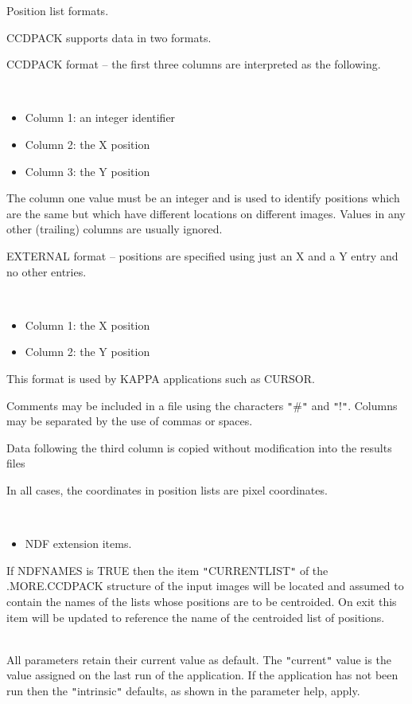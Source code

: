 \documentclass[twoside,11pt]{article}
\newcommand{\xref}[3]{#1}
\renewcommand{\_}{\texttt{\symbol{95}}}
\newcommand{\qt}[1]{{\tt "}#1{\tt "}}
\newcommand{\sstdiytopic}[2]{\item[#1:] \mbox{} \\[1.3ex] #2}
\newcommand{\sstitemlist}[1]{
  \mbox{} \\
  \vspace{-3.5ex}
  \begin{itemize}
     #1
  \end{itemize}
}
\newcommand{\sstitem}{\item}
\newcommand{\sstdiytopic}[2]{\item[{#1:}] #2 }
\newcommand{\sstitemlist}[1]{
      \begin{itemize}
         #1
      \end{itemize}
      \\
   }
\newcommand{\sstitem}{\item}
\begin{document}
{{{         \sstitem
         Position list formats.

      }
        CCDPACK supports data in two formats.

        CCDPACK format -- the first three columns are interpreted as the
        following.

      \sstitemlist{

         \sstitem
              Column 1: an integer identifier

         \sstitem
              Column 2: the X position

         \sstitem
              Column 3: the Y position

      }
        The column one value must be an integer and is used to identify
        positions which are the same but which have different locations
        on different images. Values in any other (trailing) columns are
        usually ignored.

        EXTERNAL format -- positions are specified using just an X and
        a Y entry and no other entries.

      \sstitemlist{

         \sstitem
              Column 1: the X position

         \sstitem
              Column 2: the Y position

      }
        This format is used by KAPPA applications such as
        \xref{CURSOR}{sun95}{CURSOR}.

        Comments may be included in a file using the characters \qt{\#} and
        \qt{!}. Columns may be separated by the use of commas or spaces.

        Data following the third column is copied without modification
        into the results files

        In all cases, the coordinates in position lists are pixel 
        coordinates.

      \sstitemlist{

         \sstitem
         NDF extension items.

      }
        If NDFNAMES is TRUE then the item \qt{CURRENT\_LIST} of the
        .MORE.CCDPACK structure of the input images will be located
        and assumed to contain the names of the lists whose positions
        are to be centroided. On exit this item will be updated to
        reference the name of the centroided list of positions.
   }
   \sstdiytopic{
      Behaviour of parameters
   } {
      All parameters retain their current value as default. The
      \qt{current} value is the value assigned on the last run of the
      application. If the application has not been run then the
      \qt{intrinsic} defaults, as shown in the parameter help, apply.

}}
\end{document}
